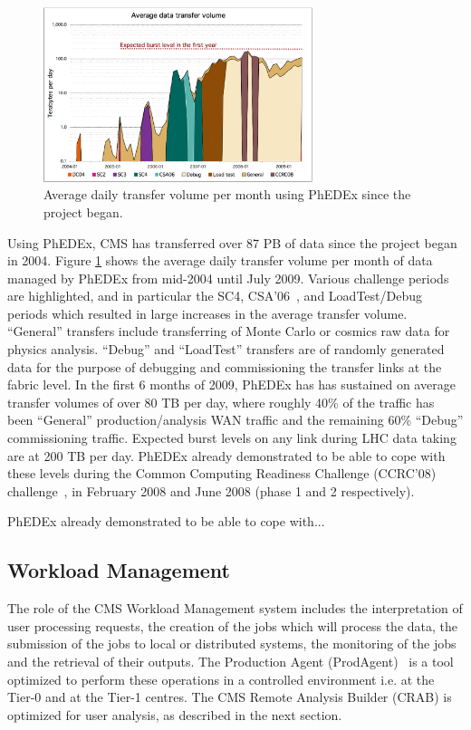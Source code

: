 \begin{figure}
\centering
 \includegraphics[width=0.70\textwidth]{phedex-avg-monthly-volume.eps}
\caption{Average daily transfer volume per month using PhEDEx since the project began.}
\label{fig:phedex-transfers}
\end{figure}

Using PhEDEx, CMS has transferred over 87 PB of data since the project 
began in 2004.  Figure \ref{fig:phedex-transfers} shows the average
daily transfer volume per month of data managed by PhEDEx from
mid-2004 until July 2009.  Various challenge periods are highlighted,
and in particular the SC4, CSA'06~\cite{RefPastExp}, and LoadTest/Debug periods which resulted
in large increases in the average transfer volume.  ``General'' transfers
include transferring of Monte Carlo or cosmics raw data for physics
analysis.  ``Debug'' and ``LoadTest'' transfers are of randomly
generated data for the purpose of debugging and commissioning the transfer links at the fabric level.
In the first 6 months of 2009, PhEDEx has 
has sustained on average transfer volumes of over 80 TB per day, where roughly
40\% of the traffic has been ``General'' production/analysis WAN traffic
and the remaining 60\% ``Debug'' commissioning traffic.  
Expected burst levels on any link during LHC data taking are at 200 TB per day.
PhEDEx already demonstrated to be able to cope with these levels during the 
Common Computing Readiness Challenge (CCRC'08) challenge~\cite{RefCCRC08}, in February 2008 and June 2008 (phase 1 and 2 respectively).

PhEDEx already demonstrated to be able to cope with...

\subsection{Workload Management}
The role of the CMS Workload Management system includes the interpretation of user processing requests, the creation of the jobs which will process the data, the submission of the jobs to local or distributed systems, the monitoring of the jobs and the retrieval of their outputs. The Production Agent (ProdAgent)~\cite{RefPA} is a tool optimized to perform these operations in a controlled environment i.e. at the Tier-0 and at the Tier-1 centres. The CMS Remote Analysis Builder (CRAB) is optimized for user analysis, as described in the next section.

